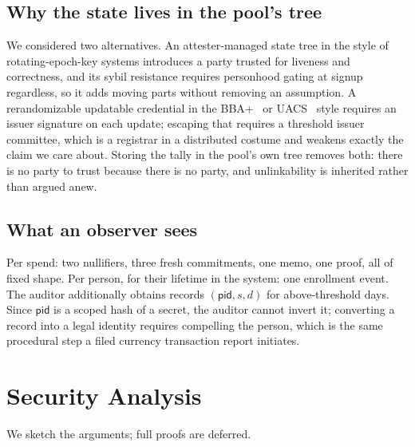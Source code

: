 \documentclass[11pt,a4paper]{article}
\theoremstyle{definition}
\theoremstyle{plain}
\theoremstyle{remark}
\newcommand{\pid}{\ensuremath{\mathsf{pid}}}
\begin{document}
\subsection{Why the state lives in the pool's tree}

We considered two alternatives. An attester-managed state tree in the style of rotating-epoch-key systems introduces a party trusted for liveness and correctness, and its sybil resistance requires personhood gating at signup regardless, so it adds moving parts without removing an assumption. A rerandomizable updatable credential in the BBA+~\cite{bbaplus} or UACS~\cite{uacs} style requires an issuer signature on each update; escaping that requires a threshold issuer committee, which is a registrar in a distributed costume and weakens exactly the claim we care about. Storing the tally in the pool's own tree removes both: there is no party to trust because there is no party, and unlinkability is inherited rather than argued anew.

\subsection{What an observer sees}

Per spend: two nullifiers, three fresh commitments, one memo, one proof, all of fixed shape. Per person, for their lifetime in the system: one enrollment event. The auditor additionally obtains records $(\pid, s, d)$ for above-threshold days. Since $\pid$ is a scoped hash of a secret, the auditor cannot invert it; converting a record into a legal identity requires compelling the person, which is the same procedural step a filed currency transaction report initiates.

\section{Security Analysis}
\label{sec:security}

We sketch the arguments; full proofs are deferred.
\end{document}
